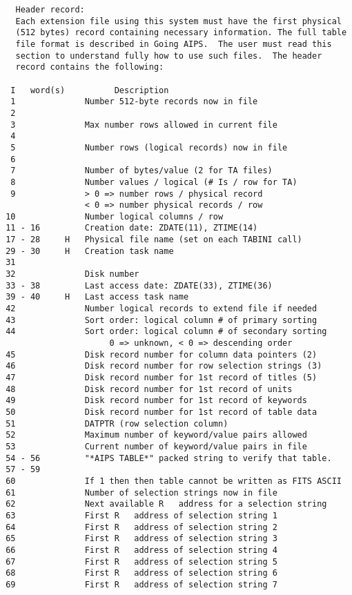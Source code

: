 \begin{verbatim}
   Header record:
   Each extension file using this system must have the first physical
   (512 bytes) record containing necessary information. The full table
   file format is described in Going AIPS.  The user must read this
   section to understand fully how to use such files.  The header
   record contains the following:

  I   word(s)          Description
  1              Number 512-byte records now in file
  2
  3              Max number rows allowed in current file
  4
  5              Number rows (logical records) now in file
  6
  7              Number of bytes/value (2 for TA files)
  8              Number values / logical (# Is / row for TA)
  9              > 0 => number rows / physical record
                 < 0 => number physical records / row
 10              Number logical columns / row
 11 - 16         Creation date: ZDATE(11), ZTIME(14)
 17 - 28     H   Physical file name (set on each TABINI call)
 29 - 30     H   Creation task name
 31
 32              Disk number
 33 - 38         Last access date: ZDATE(33), ZTIME(36)
 39 - 40     H   Last access task name
 42              Number logical records to extend file if needed
 43              Sort order: logical column # of primary sorting
 44              Sort order: logical column # of secondary sorting
                      0 => unknown, < 0 => descending order
 45              Disk record number for column data pointers (2)
 46              Disk record number for row selection strings (3)
 47              Disk record number for 1st record of titles (5)
 48              Disk record number for 1st record of units
 49              Disk record number for 1st record of keywords
 50              Disk record number for 1st record of table data
 51              DATPTR (row selection column)
 52              Maximum number of keyword/value pairs allowed
 53              Current number of keyword/value pairs in file
 54 - 56         "*AIPS TABLE*" packed string to verify that table.
 57 - 59
 60              If 1 then then table cannot be written as FITS ASCII
 61              Number of selection strings now in file
 62              Next available R   address for a selection string
 63              First R   address of selection string 1
 64              First R   address of selection string 2
 65              First R   address of selection string 3
 66              First R   address of selection string 4
 67              First R   address of selection string 5
 68              First R   address of selection string 6
 69              First R   address of selection string 7

\end{verbatim}
